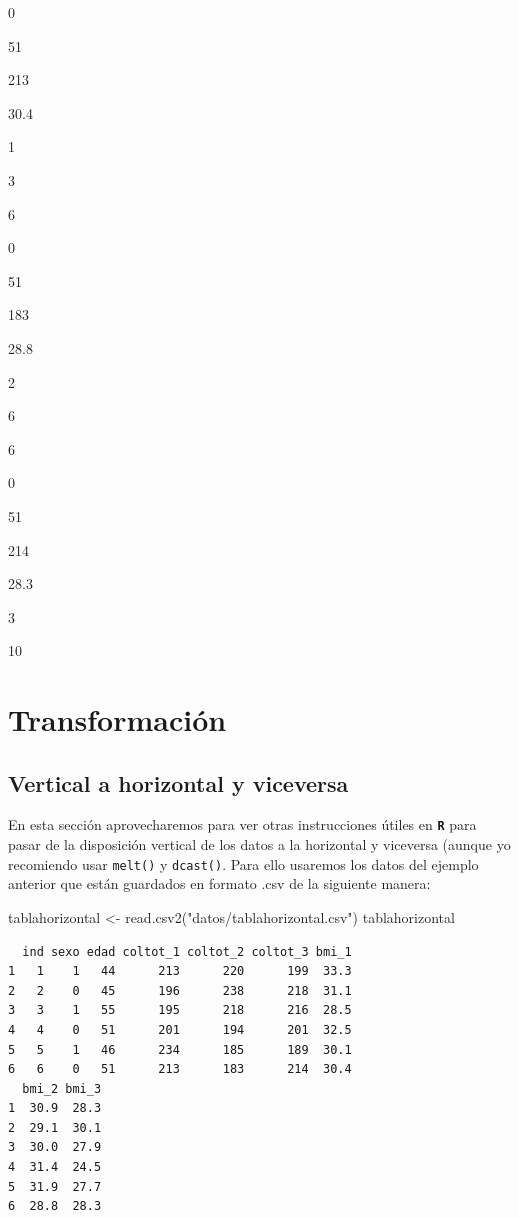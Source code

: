 \documentclass[
]{book}
\newenvironment{Shaded}{\begin{snugshade}}{\end{snugshade}}
\newcommand{\FunctionTok}[1]{\textcolor[rgb]{0.00,0.00,0.00}{#1}}
\newcommand{\NormalTok}[1]{#1}
\newcommand{\OtherTok}[1]{\textcolor[rgb]{0.56,0.35,0.01}{#1}}
\newcommand{\StringTok}[1]{\textcolor[rgb]{0.31,0.60,0.02}{#1}}
\begin{document}
0

51

213

30.4

1

3

6

0

51

183

28.8

2

6

6

0

51

214

28.3

3

10

\hypertarget{transformaciuxf3n}{%
\section{Transformación}\label{transformaciuxf3n}}

\hypertarget{vertical-a-horizontal-y-viceversa}{%
\subsection{Vertical a horizontal y viceversa}\label{vertical-a-horizontal-y-viceversa}}

En esta sección aprovecharemos para ver otras instrucciones útiles en \textbf{\texttt{R}} para pasar de la disposición vertical de los datos a la horizontal y viceversa (aunque yo recomiendo usar \texttt{melt()} y \texttt{dcast()}. Para ello usaremos los datos del ejemplo anterior que están guardados en formato .csv de la siguiente manera:

\begin{Shaded}
\begin{Highlighting}[]
\NormalTok{tablahorizontal }\OtherTok{\textless{}{-}} \FunctionTok{read.csv2}\NormalTok{(}\StringTok{"datos/tablahorizontal.csv"}\NormalTok{)}
\NormalTok{tablahorizontal}
\end{Highlighting}
\end{Shaded}

\begin{verbatim}
  ind sexo edad coltot_1 coltot_2 coltot_3 bmi_1
1   1    1   44      213      220      199  33.3
2   2    0   45      196      238      218  31.1
3   3    1   55      195      218      216  28.5
4   4    0   51      201      194      201  32.5
5   5    1   46      234      185      189  30.1
6   6    0   51      213      183      214  30.4
  bmi_2 bmi_3
1  30.9  28.3
2  29.1  30.1
3  30.0  27.9
4  31.4  24.5
5  31.9  27.7
6  28.8  28.3
\end{verbatim}
\end{document}
